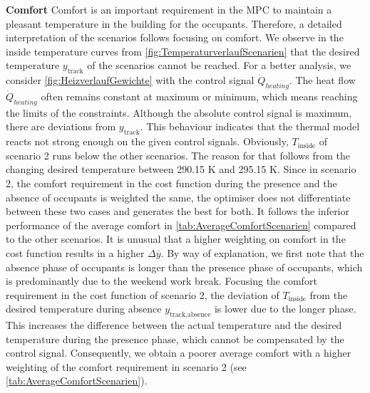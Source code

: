 \textbf{Comfort}\newline
Comfort is an important requirement in the MPC to maintain a pleasant temperature in the building for the occupants. Therefore, a detailed interpretation of the scenarios follows focusing on comfort.\newline
We observe in the inside temperature curves from \autoref{fig:TemperaturverlaufScenarien} that the desired temperature $y_\text{track}$ of the scenarios cannot be reached. For a better analysis, we consider \autoref{fig:HeizverlaufGewichte} with the control signal $\dot{Q}_{heating}$. The heat flow $\dot{Q}_{heating}$ often remains constant at maximum or minimum, which means reaching the limits of the constraints. Although the absolute control signal is maximum, there are deviations from $y_\text{track}$. This behaviour indicates that the thermal model reacts not strong enough on the given control signals.\newline
Obviously, $T_\text{inside}$ of scenario 2 runs below the other scenarios. The reason for that follows from the changing desired temperature between 290.15 K and 295.15 K. Since in scenario 2, the comfort requirement in the cost function during the presence and the absence of occupants is weighted the same, the optimiser does not differentiate between these two cases and generates the best for both. It follows the inferior performance of the average comfort in \autoref{tab:AverageComfortScenarien} compared to the other scenarios. It is unusual that a higher weighting on comfort in the cost function results in a higher $\Delta \overline{y}$. By way of explanation, we first note that the absence phase of occupants is longer than the presence phase of occupants, which is predominantly due to the weekend work break. Focusing the comfort requirement in the cost function of scenario 2, the deviation of $T_\text{inside}$ from the desired temperature during absence $y_\text{track,absence}$ is lower due to the longer phase. This increases the difference between the actual temperature and the desired temperature during the presence phase, which cannot be compensated by the control signal. Consequently, we obtain a poorer average comfort with a higher weighting of the comfort requirement in scenario 2 (see \autoref{tab:AverageComfortScenarien}).\newline 
